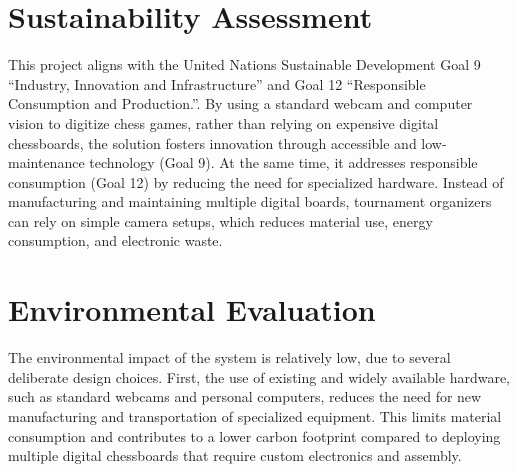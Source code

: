 



\section{Sustainability Assessment}
This project aligns with the United Nations Sustainable Development Goal 9 “Industry, Innovation and Infrastructure” and Goal 12 “Responsible Consumption and Production.”. By using a standard webcam and computer vision to digitize chess games, rather than relying on expensive digital chessboards, the solution fosters innovation through accessible and low-maintenance technology (Goal 9). At the same time, it addresses responsible consumption (Goal 12) by reducing the need for specialized hardware. Instead of manufacturing and maintaining multiple digital boards, tournament organizers can rely on simple camera setups, which reduces material use, energy consumption, and electronic waste.

\section{Environmental Evaluation}
The environmental impact of the system is relatively low, due to several deliberate design choices. First, the use of existing and widely available hardware, such as standard webcams and personal computers, reduces the need for new manufacturing and transportation of specialized equipment. This limits material consumption and contributes to a lower carbon footprint compared to deploying multiple digital chessboards that require custom electronics and assembly. \\

